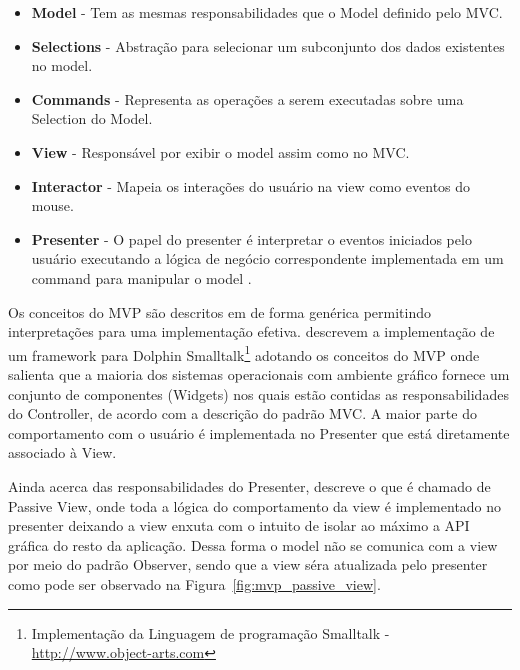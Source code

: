 \documentclass[conference]{IEEEtran}
\begin{document}
\begin{itemize}
\item \textbf{Model} - Tem as mesmas responsabilidades que o Model definido
pelo MVC.
\item \textbf{Selections} - Abstração para selecionar um subconjunto dos
dados existentes no model.
\item \textbf{Commands} - Representa as operações a serem executadas sobre
uma Selection do Model.
\item \textbf{View} - Responsável por exibir o model assim como no MVC.
\item \textbf{Interactor} - Mapeia os interações do usuário na view como
eventos do mouse.
\item \textbf{Presenter} - O papel do presenter é interpretar o eventos
iniciados pelo usuário executando a lógica de negócio correspondente implementada em um
  command para manipular o model \cite{Potel96mvp}.
\end{itemize}


Os conceitos do MVP são descritos em \cite{Potel96mvp} de forma genérica
permitindo interpretações para uma implementação efetiva.
\cite{twisttriad:2000} descrevem a implementação de um framework para
Dolphin Smalltalk\footnote{Implementação da Linguagem de programação Smalltalk - 
\url{http://www.object-arts.com}} adotando os conceitos do MVP onde salienta que
a maioria dos sistemas operacionais com ambiente gráfico fornece um conjunto de
componentes (Widgets) nos quais estão contidas as responsabilidades do
Controller, de acordo com a descrição do padrão MVC. A maior parte do
comportamento com o usuário é implementada no Presenter que está
diretamente associado à View.

Ainda acerca das responsabilidades do Presenter, \cite{fowler:ui} descreve
o que é chamado de Passive View, onde toda a lógica do comportamento da view é
implementado no presenter deixando a view enxuta com o intuito de isolar ao
máximo a API gráfica do resto da aplicação. Dessa forma o model não se comunica
com a view por meio do padrão Observer, sendo que a view séra atualizada
pelo presenter como pode ser observado na Figura~\ref{fig:mvp_passive_view}.
\end{document}
